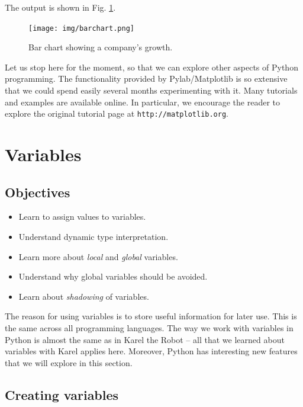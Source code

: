 \documentclass[article,A4,12pt]{llncs}
\begin{document}
\noindent
The output is shown in Fig. \ref{fig:barch}.
\newpage

\begin{figure}[!ht]
\begin{center}
\texttt{[image: img/barchart.png]}
\end{center}
\vspace{-2mm}
\caption{Bar chart showing a company's growth.}
\label{fig:barch}
\end{figure}
\noindent
Let us stop here for the moment, so that we can explore other aspects of Python programming. 
The functionality provided by Pylab/Matplotlib is so extensive that we could spend  easily several 
months experimenting with it. Many tutorials and examples are available online. In particular, 
we encourage the reader to explore the original tutorial page at {\tt http://matplotlib.org}.



\section{Variables}

\subsection{Objectives}

\begin{itemize}
\item Learn to assign values to variables.
\item Understand dynamic type interpretation.
\item Learn more about {\em local} and {\em global} variables.
\item Understand why global variables should be avoided.
\item Learn about {\em shadowing} of variables.
\end{itemize}
The reason for using variables is to store useful information for later use. This is the same across
all programming languages. The way we work with 
variables in Python is almost the same as in Karel the Robot -- all that we learned 
about variables with Karel applies here. Moreover, Python has interesting new features 
that we will explore in this section. 

\subsection{Creating variables}
\end{document}
